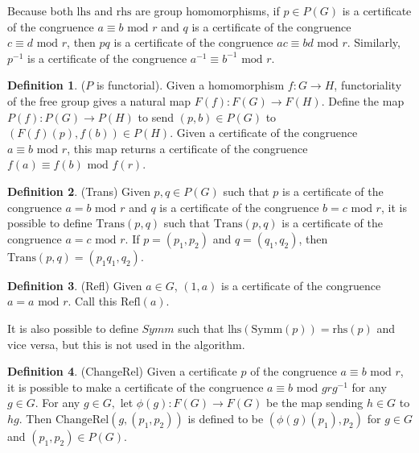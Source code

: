 \documentclass[11pt]{article} %
\theoremstyle{definition}
\theoremstyle{definition}
\theoremstyle{definition}
\theoremstyle{definition}
\theoremstyle{definition}
\theoremstyle{definition}
\newtheorem{subdef}{Definition}[theorem]
\begin{document}

Because both $\text{lhs}$ and $\text{rhs}$ are group homomorphisms, if $p \in P(G)$ is a certificate
of the congruence $a \equiv b \text{ mod } r$ and $q$ is a certificate of the congruence
$c \equiv d \text{ mod } r$, then $pq$ is a certificate of the congruence $ac \equiv bd \text{ mod } r$.
Similarly, $p^{-1}$ is a certificate of the congruence $a^{-1} \equiv b^{-1} \text{ mod } r$.

\begin{subdef}($P$ is functorial).
  Given a homomorphism $f: G \to H$,
  functoriality of the free group gives a natural map $F(f): F(G) \to F(H)$.
  Define the map $P(f): P(G) \to P(H)$ to send $(p, b) \in P(G)$ to $(F(f)(p), f(b)) \in P(H)$.
  Given a certificate of the congruence $a \equiv b \text{ mod } r$, this map returns
  a certificate of the congruence $f(a) \equiv f(b) \text{ mod } f(r)$.
\end{subdef}

\begin{subdef}(Trans)
  Given $p,q \in P(G)$ such that $p$ is a certificate of the congruence $a = b \text{ mod } r$
  and $q$ is a certificate of the congruence $b = c \text{ mod } r$, it is possible to define
  $\text{Trans}(p,q)$ such that $\text{Trans}(p,q)$ is a certificate of the congruence $a = c \text{ mod } r$.
  If $p = (p_1, p_2)$ and $q = (q_1, q_2)$, then $\text{Trans}(p,q) = (p_1q_1, q_2)$.
\end{subdef}

\begin{subdef}(Refl)
  Given $a \in G$, $(1, a)$ is a certificate of the congruence $a = a \text{ mod } r$. Call
  this $\text{Refl}(a)$.
\end{subdef}

It is also possible to define $\textit{Symm}$ such that $\text{lhs}(\text{Symm}(p)) = \text{rhs}(p)$
and vice versa, but this is not used in the algorithm.

\begin{subdef}(ChangeRel)
  Given a certificate $p$ of the congruence $a \equiv b \text{ mod } r$, it is possible
  to make a certificate of the congruence $a \equiv b \text{ mod } g r g^{-1}$ for any $g \in G$.
  For any $g \in G,$ let $\phi(g): F(G) \to F(G)$ be the map sending $h \in G$ to
  $hg$. Then $\text{ChangeRel}(g,(p_1,p_2))$ is defined to be $(\phi(g)(p_1), p_2)$ for
  $g \in G$ and $(p_1, p_2) \in P(G)$.
\end{subdef}
\end{document}
